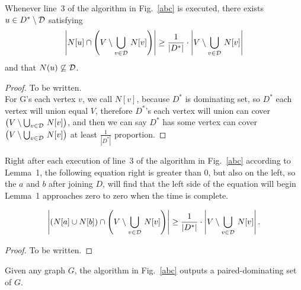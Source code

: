 \documentclass[12pt]{article}
\begin{document}
\begin{lemma}
Whenever line~3 of the algorithm in Fig.~\ref{abc} is executed,
there exists $u\in D^*\setminus {\cal D}$ satisfying
$$
\left|N[u]\cap \left(V\setminus \bigcup_{v\in {\cal D}}\,N[v]\right)\right|
\ge \frac{1}{|D^*|}
\cdot\left|V\setminus \bigcup_{v\in {\cal D}}\,N[v]\right|
$$
and that $N(u)\not\subseteq {\cal D}$.
\end{lemma}
\begin{proof}
To be written.\\
For G's each vertex $v$, we call $N[v]$, because $D^*$ is dominating set, so $D^*$ each vertex will union equal $V$, therefore $D^*$'s each vertex will union can cover 
$\left(V\setminus \bigcup_{v\in {\cal D}}\,N[v]\right)$, and then we can say $D^*$ has some vertex can cover $\left(V\setminus \bigcup_{v\in {\cal D}}\,N[v]\right)$ at least $\frac{1}{|D^*|}$ proportion.

\end{proof}

\begin{lemma}
Right after each execution of line~3 of the algorithm in Fig.~\ref{abc} according to Lemma~1, the following equation right is greater than 0, but also on the left, so the $a$ and $b$ after joining $D$, will find that the left side of the equation will begin Lemma~1 approaches zero to zero when the time is complete.

$$
\left|\left(N[a]\cup N[b]\right)\cap \left(V\setminus \bigcup_{v\in {\cal D}}\,N[v]\right)\right|
\ge \frac{1}{|D^*|}
\cdot\left|V\setminus \bigcup_{v\in {\cal D}}\,N[v]\right|.
$$
\end{lemma}
\begin{proof}
To be written.
\end{proof}

\begin{lemma}
Given any graph $G$, the algorithm in Fig.~\ref{abc} outputs a paired-dominating set of $G$.
\end{lemma}



\end{document}
